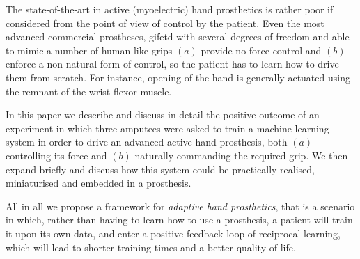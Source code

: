The state-of-the-art in active (myoelectric) hand prosthetics is
rather poor if considered from the point of view of control by the
patient. Even the most advanced commercial prostheses, gifetd with
several degrees of freedom and able to mimic a number of human-like
grips $(a)$ provide no force control and $(b)$ enforce a non-natural
form of control, so the patient has to learn how to drive them from
scratch. For instance, opening of the hand is generally actuated using
the remnant of the wrist flexor muscle.

In this paper we describe and discuss in detail the positive outcome
of an experiment in which three amputees were asked to train a machine
learning system in order to drive an advanced active hand prosthesis,
both $(a)$ controlling its force and $(b)$ naturally commanding the
required grip. We then expand briefly and discuss how this system
could be practically realised, miniaturised and embedded in a
prosthesis.

All in all we propose a framework for \emph{adaptive hand
prosthetics}, that is a scenario in which, rather than having to learn
how to use a prosthesis, a patient will train it upon its own data,
and enter a positive feedback loop of reciprocal learning, which will
lead to shorter training times and a better quality of life.
